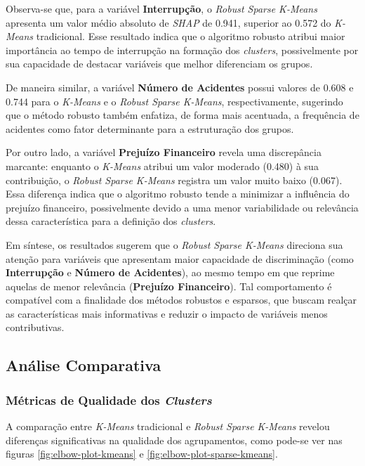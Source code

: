 \documentclass[conference]{IEEEtran}
\begin{document}
Observa-se que, para a variável \textbf{Interrupção}, o \textit{Robust Sparse K-Means} apresenta um valor médio absoluto de \textit{SHAP} de 0.941, superior ao 0.572 do \textit{K-Means} tradicional. Esse resultado indica que o algoritmo robusto atribui maior importância ao tempo de interrupção na formação dos \textit{clusters}, possivelmente por sua capacidade de destacar variáveis que melhor diferenciam os grupos.

De maneira similar, a variável \textbf{Número de Acidentes} possui valores de 0.608 e 0.744 para o \textit{K-Means} e o \textit{Robust Sparse K-Means}, respectivamente, sugerindo que o método robusto também enfatiza, de forma mais acentuada, a frequência de acidentes como fator determinante para a estruturação dos grupos.

Por outro lado, a variável \textbf{Prejuízo Financeiro} revela uma discrepância marcante: enquanto o \textit{K-Means} atribui um valor moderado (0.480) à sua contribuição, o \textit{Robust Sparse K-Means} registra um valor muito baixo (0.067). Essa diferença indica que o algoritmo robusto tende a minimizar a influência do prejuízo financeiro, possivelmente devido a uma menor variabilidade ou relevância dessa característica para a definição dos \textit{clusters}.

Em síntese, os resultados sugerem que o \textit{Robust Sparse K-Means} direciona sua atenção para variáveis que apresentam maior capacidade de
discriminação (como \textbf{Interrupção} e \textbf{Número de Acidentes}), ao mesmo tempo em que reprime aquelas de menor relevância (\textbf{Prejuízo Financeiro}). Tal comportamento é compatível com a finalidade dos métodos robustos e esparsos, que buscam realçar as características mais informativas e reduzir o impacto de variáveis menos contributivas.


\subsection{Análise Comparativa}

\subsubsection{Métricas de Qualidade dos \textit{Clusters}}
A comparação entre \textit{K-Means} tradicional e \textit{Robust Sparse K-Means} revelou diferenças significativas na qualidade dos agrupamentos, como pode-se ver nas figuras \ref{fig:elbow-plot-kmeans} e \ref{fig:elbow-plot-sparse-kmeans}.
\end{document}

